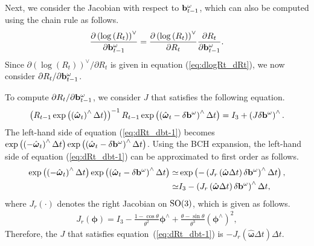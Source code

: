 Next, we consider the Jacobian with respect to ${\bf b}_{t-1}^{\omega}$, which can also be computed using the chain rule as follows.
%
\begin{align}
  \frac{ \partial \left( \log \left( R_{t} \right) \right)^{\vee} }{ \partial {\bf b}_{t-1}^{\omega} }
  =
  \frac{ \partial \left( \log \left( R_{t} \right) \right)^{\vee} }{ \partial R_{t} }
  \frac{ \partial R_{t} }{ \partial {\bf b}_{t-1}^{\omega} }.
  \label{eq:dlogRt_dbomegat-1}
\end{align}
%
Since $\partial \left( \log \left( R_{t} \right) \right)^{\vee} / \partial R_{t}$ is given in equation (\ref{eq:dlogRt_dRt}), we now consider $\partial R_{t} / \partial {\bf b}_{t-1}^{\omega}$.

To compute $\partial R_{t} / \partial {\bf b}_{t-1}^{\omega}$, we consider $J$ that satisfies the following equation.
%
\begin{align}
  \left( R_{t-1} \exp \left( \left( \hat{ \boldsymbol \omega }_{t} \right)^{\wedge} \Delta t \right) \right)^{-1} R_{t-1} \exp \left( \left( \hat{ \boldsymbol \omega }_{t} - \delta {\bf b}^{\omega} \right)^{\wedge} \Delta t \right)
  = 
  I_{3} + \left( J \delta {\bf b}^{\omega} \right)^{\wedge}.
  \label{eq:dRt_dbt-1}
\end{align}
%
The left-hand side of equation (\ref{eq:dRt_dbt-1}) becomes $\exp \left( \left( - \hat{ \boldsymbol \omega }_{t} \right)^{\wedge} \Delta t \right) \exp \left( \left( \hat{ \boldsymbol \omega }_{t} - \delta {\bf b}^{\omega} \right)^{\wedge} \Delta t \right)$.
Using the BCH expansion, the left-hand side of equation (\ref{eq:dRt_dbt-1}) can be approximated to first order as follows.
%
\begin{align}
  \begin{split}
    \exp \left( \left( - \hat{ \boldsymbol \omega }_{t} \right)^{\wedge} \Delta t \right) \exp \left( \left( \hat{ \boldsymbol \omega }_{t} - \delta {\bf b}^{\omega} \right)^{\wedge} \Delta t \right)
%
    \simeq &
%
    \exp \left( - \left( J_{r} \left( \hat{ \boldsymbol \omega } \Delta t \right) \delta {\bf b}^{\omega} \right)^{\wedge} \Delta t \right), \\
%
    \simeq & 
%
    I_{3} - \left( J_{r} \left( \hat{ \boldsymbol \omega } \Delta t \right) \delta {\bf b}^{\omega} \right)^{\wedge} \Delta t,
  \end{split}
\end{align}
%
where $J_{r} \left( \cdot \right)$ denotes the right Jacobian on ${\rm SO}(3)$, which is given as follows.
%
\begin{align}
  J_{r} \left( \boldsymbol \phi \right)
  =
  I_{3} -
  \frac{ 1 - \cos \theta }{ \theta^{2} } \boldsymbol \phi^{\wedge} +
  \frac{ \theta - \sin \theta }{ \theta^{3} } \left( \boldsymbol \phi^{\wedge} \right)^{2},
\end{align}
%
Therefore, the $J$ that satisfies equation~(\ref{eq:dRt_dbt-1}) is $- J_{r} \left( \hat{ \boldsymbol \omega } \Delta t \right) \Delta t$.

